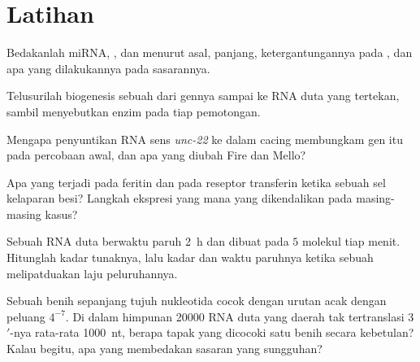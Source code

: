 \section{Latihan}

\begin{exercise}[$\star$]\label{exo:b3:rna-regulation:1}
Bedakanlah miRNA, , dan  menurut asal, panjang, ketergantungannya
pada , dan apa yang dilakukannya pada sasarannya.
\end{exercise}

\begin{exercise}[$\star$]\label{exo:b3:rna-regulation:2}
Telusurilah biogenesis sebuah  dari gennya sampai ke RNA duta yang
tertekan, sambil menyebutkan enzim pada tiap pemotongan.
\end{exercise}

\begin{exercise}[$\star$]\label{exo:b3:rna-regulation:3}
Mengapa penyuntikan RNA sens \emph{unc-22} ke dalam cacing membungkam gen itu
pada percobaan awal, dan apa yang diubah Fire dan Mello?
\end{exercise}

\begin{exercise}[$\star$]\label{exo:b3:rna-regulation:4}
Apa yang terjadi pada feritin dan pada reseptor transferin ketika sebuah sel
kelaparan besi? Langkah ekspresi yang mana yang dikendalikan pada
masing-masing kasus?
\end{exercise}

\begin{exercise}[$\star\star$]\label{exo:b3:rna-regulation:5}
Sebuah RNA duta berwaktu paruh \qty{2}{h} dan dibuat pada $5$
molekul tiap menit. Hitunglah kadar tunaknya, lalu kadar dan waktu paruhnya
ketika sebuah  melipatduakan laju peluruhannya.
\end{exercise}

\begin{exercise}[$\star\star$]\label{exo:b3:rna-regulation:6}
Sebuah benih sepanjang tujuh nukleotida cocok dengan urutan acak dengan
peluang $4^{-7}$. Di dalam himpunan \num{20000} RNA duta yang daerah tak
tertranslasi 3$'$-nya rata-rata \qty{1000}{nt}, berapa tapak yang dicocoki
satu benih  secara kebetulan? Kalau begitu, apa yang membedakan
sasaran yang sungguhan?
\end{exercise}

